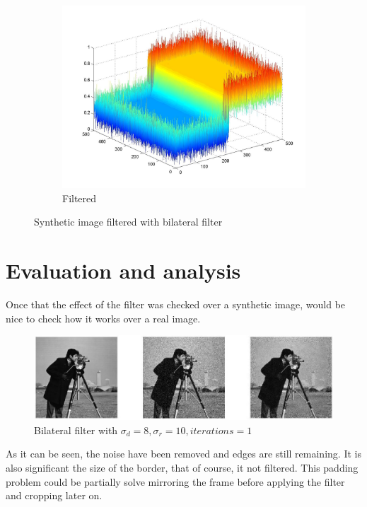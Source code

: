 \documentclass[a4paper, 10pt, conference] {article}
\begin{document}
\begin{figure}[H]
	\begin{subfigure}{0.29\textwidth} 						\includegraphics[scale=0.13]{filtered_1.JPG}
		\caption{Filtered}
	\end{subfigure}
	\caption{Synthetic image filtered with bilateral filter}
	\label{mesh}
\end{figure}
 

\section{Evaluation and analysis}
Once that the effect of the filter was checked over a synthetic image, would be nice to check how it works over a real image.
\begin{figure}[H]
	\centering
	\includegraphics[width=1\textwidth]{camera_analysis.JPG} %
	\caption{Bilateral filter with $\sigma_{d}=8, \sigma_{r}=10, iterations = 1$}
	\label{camera}
\end{figure}
As it can be seen, the noise have been removed and edges are still remaining. It is also significant the size of the border, that of course, it not filtered. This padding problem could be partially solve mirroring the frame before applying the filter and cropping later on.    
\end{document}
